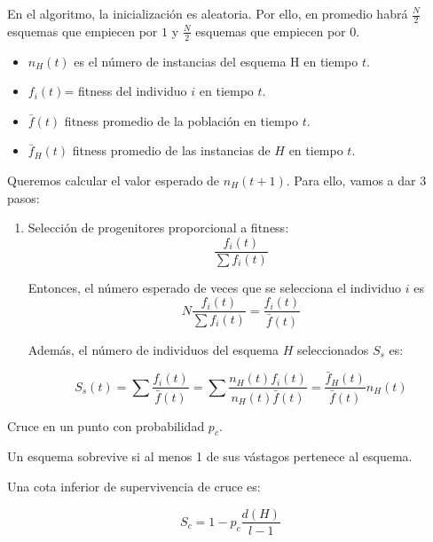 \documentclass{apuntes}
\begin{document}
En el algoritmo, la inicialización es aleatoria. Por ello, en promedio habrá $\frac{N}{2}$ esquemas que empiecen por $1$ y $\frac{N}{2}$ esquemas que empiecen por $0$.


\begin{defn}[Funciones de $t$]
\begin{itemize}
	\item $n_H(t)$ es el número de instancias del esquema H en tiempo $t$.
	\item $f_i(t)$= fitness del individuo $i$ en tiempo $t$.
	\item $\bar{f}(t)$ fitness promedio de la población en tiempo $t$.
	\item $\bar{f}_H(t)$ fitness promedio de las instancias de $H$ en tiempo $t$.
\end{itemize}
\end{defn}

Queremos calcular el valor esperado de $n_H(t+1)$. Para ello, vamos a dar 3 pasos:

\begin{enumerate}
	\item Selección de progenitores proporcional a fitness: \[\frac{f_i(t)}{\sum f_i(t)}\]

	Entonces, el número esperado de veces que se selecciona el individuo $i$ es \[N\frac{f_i(t)}{\sum f_i(t)} = \frac{f_i(t)}{\bar{f}(t)} \]

	Además, el número de individuos del esquema $H$ seleccionados $S_s$ es:

	\[S_s(t) = \sum \frac{f_i(t)}{\bar{f}(t)} = \sum \frac{n_H(t)f_i(t)}{n_H(t)\bar{f}(t)} = \frac{\bar{f}_H(t)}{\bar{f}(t)}n_H(t)\]
\end{enumerate}


\begin{example}
Cruce en un punto con probabilidad $p_c$.

Un esquema sobrevive si al menos 1 de sus vástagos pertenece al esquema.

 Una cota inferior de supervivencia de cruce es:

 \[ S_c = 1 - p_c\frac{d(H)}{l-1}\]


\end{example}
\end{document}
